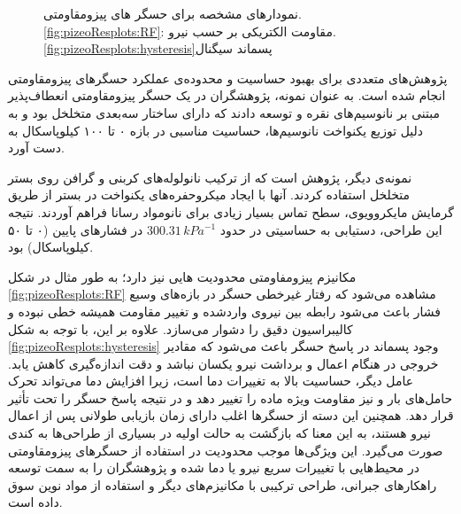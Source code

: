 	\begin{figure}[ht]
		\centering 
		\caption{نمودارهای مشخصه برای حسگر های پیزومقاومتی.
		\ref{fig:pizeoResplots:RF}: مقاومت الکتریکی بر حسب نیرو.
	\ref{fig:pizeoResplots:hysteresis}پسماند سیگنال
\cite{koiva2013piezores}}
		\label{fig:pizeoResplots} %
	\end{figure}
	
	
	
	پژوهش‌های متعددی برای بهبود حساسیت و محدوده‌ی عملکرد حسگرهای پیزومقاومتی انجام شده است. به عنوان نمونه، پژوهشگران در
	\cite{jing2022ag} 
	یک حسگر پیزومقاومتی انعطاف‌‌پذیر مبتنی بر نانوسیم‌های نقره و 
	توسعه دادند که دارای ساختار سه‌بعدی متخلخل بود و به دلیل توزیع یکنواخت نانوسیم‌ها، حساسیت مناسبی در بازه ۰ تا ۱۰۰ کیلوپاسکال به دست آورد.  
	
	نمونه‌ی دیگر، پژوهش \cite{zhao2022pdms} است که از ترکیب نانولوله‌های کربنی و گرافن روی بستر
	متخلخل استفاده کردند. آنها با ایجاد میکروحفره‌های یکنواخت در بستر از طریق گرمایش مایکروویوی، سطح تماس بسیار زیادی برای نانومواد رسانا فراهم آوردند. نتیجه این طراحی، دستیابی به حساسیتی در حدود \(300.31 \, kPa^{-1}\) در فشارهای پایین (۰ تا ۵۰ کیلوپاسکال) بود.  
	
	مکانیزم پیزومفاومتی محدودیت هایی نیز دارد؛ به طور مثال در شکل
	\ref{fig:pizeoResplots:RF}
	مشاهده می‌شود که رفتار غیرخطی حسگر در بازه‌های وسیع فشار باعث می‌شود رابطه بین نیروی واردشده و تغییر مقاومت همیشه خطی نبوده و کالیبراسیون دقیق را دشوار می‌سازد.
	علاوه بر این، با توجه به شکل 
	\ref{fig:pizeoResplots:hysteresis}
	وجود پسماند
	در پاسخ حسگر باعث می‌شود که مقادیر خروجی در هنگام اعمال و برداشت نیرو یکسان نباشد و دقت اندازه‌گیری کاهش یابد. عامل دیگر، حساسیت بالا به تغییرات دما است، زیرا افزایش دما می‌تواند تحرک حامل‌های بار و نیز مقاومت ویژه ماده را تغییر دهد و در نتیجه پاسخ حسگر را تحت تأثیر قرار دهد. همچنین این دسته از حسگرها اغلب دارای زمان بازیابی طولانی پس از اعمال نیرو هستند، به این معنا که بازگشت به حالت اولیه در بسیاری از طراحی‌ها به کندی صورت می‌گیرد. این ویژگی‌ها موجب محدودیت در استفاده از حسگرهای پیزومقاومتی در محیط‌هایی با تغییرات سریع نیرو یا دما شده و پژوهشگران را به سمت توسعه راهکارهای جبرانی، طراحی ترکیبی با مکانیزم‌های دیگر و استفاده از مواد نوین سوق داده است.
	
